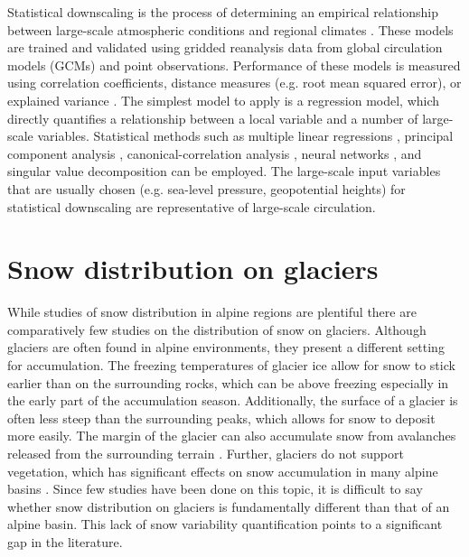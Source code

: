 \documentclass[12pt]{article}
\begin{document}
Statistical downscaling is the process of determining an empirical relationship between large-scale atmospheric conditions and regional climates \citep{Fowler2007}. These models are trained and validated using gridded reanalysis data from global circulation models (GCMs) and point observations. Performance of these models is measured using correlation coefficients, distance measures (e.g. root mean squared error), or explained variance \citep{Fowler2007}. The simplest model to apply is a regression model, which directly quantifies a relationship between a local variable and a number of large-scale variables. Statistical methods such as multiple linear regressions \citep{Hanssen-Bauer1998}, principal component analysis \citep{Kidson1998}, canonical-correlation analysis \citep{Busuioc2001}, neural networks \citep{Zorita1999}, and singular value decomposition \citep{Widmann2003} can be employed. The large-scale input variables that are usually chosen (e.g. sea-level pressure, geopotential heights) for statistical downscaling are representative of large-scale circulation. 

\section{Snow distribution on glaciers}
While studies of snow distribution in alpine regions are plentiful \citep[and sources within]{Clark2011} there are comparatively few studies on the distribution of snow on glaciers. Although glaciers are often found in alpine environments, they present a different setting for accumulation. The freezing temperatures of glacier ice allow for snow to stick earlier than on the surrounding rocks, which can be above freezing especially in the early part of the accumulation season. Additionally, the surface of a glacier is often less steep than the surrounding peaks, which allows for snow to deposit more easily. The margin of the glacier can also accumulate snow from avalanches released from the surrounding terrain \citep{Bloschl1991, Mott2008}. Further, glaciers do not support vegetation, which has significant effects on snow accumulation in many alpine basins \citep{Pomeroy1999}. Since few studies have been done on this topic, it is difficult to say whether snow distribution on glaciers is fundamentally different than that of an alpine basin. This lack of snow variability quantification points to a significant gap in the literature.
\end{document}
